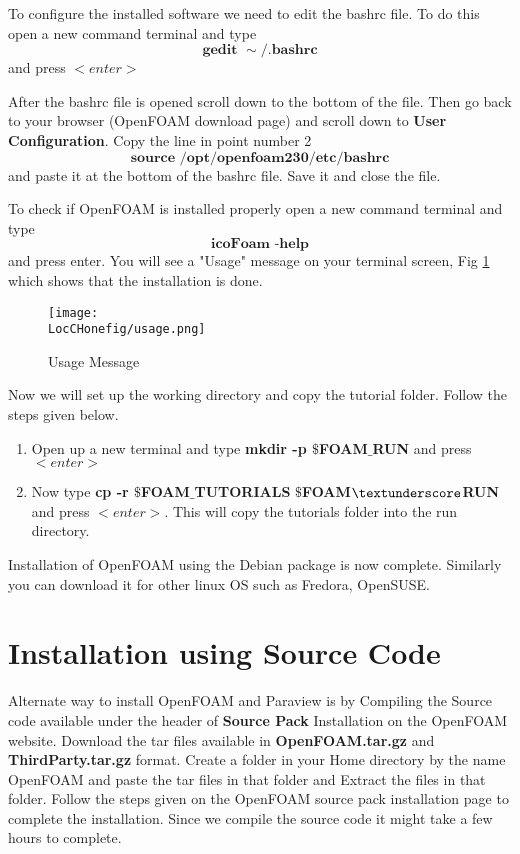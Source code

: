 \flushleft To configure the installed software we need to edit the bashrc file. 
To do this open a new command terminal and type 
\begin{equation*}
\textbf{gedit $\sim$$\slash$.bashrc} 
\end{equation*}
and press $<enter>$

\flushleft After the bashrc file is opened scroll down to the bottom of the file. Then go back to your browser (OpenFOAM download page) and scroll down to \textbf{User Configuration}.  
Copy the line in point number 2  
\begin{equation*}
\textbf{source /opt/openfoam230/etc/bashrc} 
\end{equation*}
and paste it at the bottom of the bashrc file. Save it and close the file.

\flushleft To check if OpenFOAM is installed properly open a new command terminal and type 
\begin{equation*}
\textbf{icoFoam -help} 
\end{equation*}
and press enter. You will see a "Usage" message on your terminal screen, Fig \ref{usage} which shows that the installation is done.

\begin{figure}[ht]  
\begin{center}  
\texttt{[image: \\LocCHonefig/usage.png]}
\caption{Usage Message}
\label{usage}
\end{center}  
\end{figure}

\flushleft Now we will set up the working directory and copy the tutorial folder. Follow the steps given below. 
\begin{enumerate}
\item Open up a new terminal and type \textbf{mkdir -p $\$$FOAM$\_$RUN} and press $<enter>$
\item Now type \textbf{cp -r $\$$FOAM$\_$TUTORIALS} \textbf{$\$$FOAM$\textunderscore$RUN} and press $<enter>$. This will copy the tutorials folder into the run directory.
\end{enumerate}

\flushleft Installation of OpenFOAM using the Debian package is now complete. Similarly you can download it for other linux OS such as Fredora, OpenSUSE.

\section{Installation using Source Code}
Alternate way to install OpenFOAM and Paraview is by Compiling the Source code available under the header of \textbf{Source Pack} Installation on the OpenFOAM website. 
Download the tar files available in \textbf{OpenFOAM.tar.gz} and \textbf{ThirdParty.tar.gz} format. Create a folder in your Home directory by the name OpenFOAM and paste the tar files in that folder and Extract the files in that folder.
Follow the steps given on the OpenFOAM source pack installation page to complete the installation. Since we compile the source code it might take a few hours to complete.

